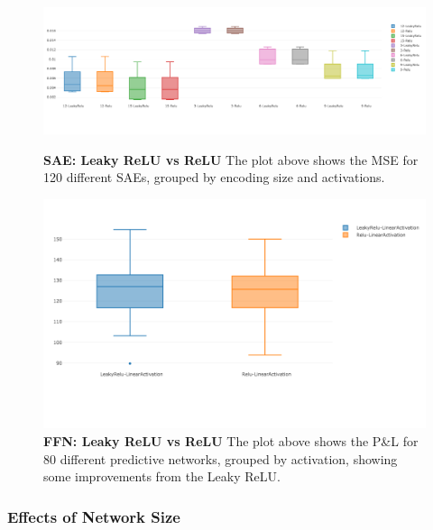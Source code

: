 \documentclass[a4paper,latin]{paper}
\begin{document}
\begin{figure}[H]
	\centering
	\begin{minipage}{0.45\textwidth}
	\centering \includegraphics[scale=0.3]{images/iteration_three/it3_leaky_relu_1.png}
	\caption{\textbf{SAE: Leaky ReLU vs ReLU} 
		\newline The plot above shows the MSE for 120 different SAEs, grouped by encoding size and activations.  }
	\label{figure-results_leaky_relu_1}
	\end{minipage}\hfill
	\begin{minipage}{0.45\textwidth}
	\centering \includegraphics[scale=0.3]{images/iteration_three/it3_leaky_relu_3.png}
	\caption{\textbf{FFN: Leaky ReLU vs ReLU} 
		\newline The plot above shows the P\&L for 80 different predictive networks, grouped by activation, showing some improvements from the Leaky ReLU.}
	\label{figure-results_leaky_relu_3}
	\end{minipage}
\end{figure}

\subsubsection{Effects of Network Size}
\end{document}
